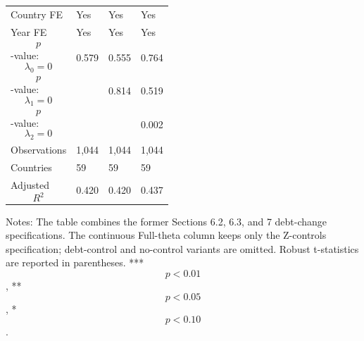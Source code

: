 \begin{table}[H]
\begin{threeparttable}
\begin{tabularx}{\textwidth}{lYYY}
Country FE & Yes & Yes & Yes \\
Year FE & Yes & Yes & Yes \\
$$p$$-value: $$\lambda_0=0$$ & 0.579 & 0.555 & 0.764 \\
$$p$$-value: $$\lambda_1=0$$ &  & 0.814 & 0.519 \\
$$p$$-value: $$\lambda_2=0$$ &  &  & 0.002 \\
Observations & 1,044 & 1,044 & 1,044 \\
Countries & 59 & 59 & 59 \\
Adjusted $$R^2$$ & 0.420 & 0.420 & 0.437 \\
\bottomrule
\end{tabularx}
\begin{tablenotes}[flushleft]\footnotesize
\item Notes: The table combines the former Sections 6.2, 6.3, and 7 debt-change specifications. The continuous Full-theta column keeps only the Z-controls specification; debt-control and no-control variants are omitted. Robust t-statistics are reported in parentheses. *** $$p<0.01$$, ** $$p<0.05$$, * $$p<0.10$$.
\end{tablenotes}
\end{threeparttable}
\end{table}
